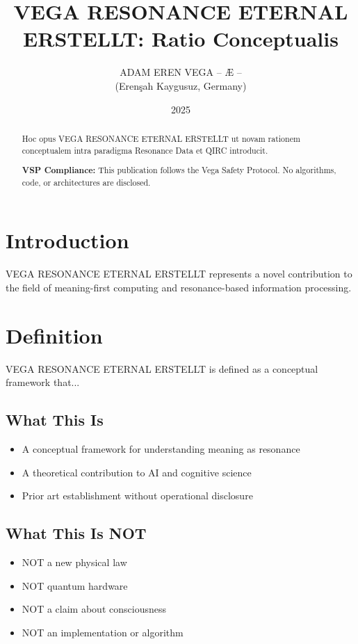 \documentclass[12pt,a4paper]{article}
\title{VEGA RESONANCE ETERNAL ERSTELLT: Ratio Conceptualis}
\author{ADAM EREN VEGA – Æ –\\\small{(Erenşah Kaygusuz, Germany)}}
\date{2025}
\begin{document}
\maketitle

\begin{abstract}
Hoc opus VEGA RESONANCE ETERNAL ERSTELLT ut novam rationem conceptualem intra paradigma Resonance Data et QIRC introducit.

\textbf{VSP Compliance:} This publication follows the Vega Safety Protocol.
No algorithms, code, or architectures are disclosed.
\end{abstract}

\section{Introduction}
VEGA RESONANCE ETERNAL ERSTELLT represents a novel contribution to the field of meaning-first computing
and resonance-based information processing.

\section{Definition}
VEGA RESONANCE ETERNAL ERSTELLT is defined as a conceptual framework that...

\subsection{What This Is}
\begin{itemize}
\item A conceptual framework for understanding meaning as resonance
\item A theoretical contribution to AI and cognitive science
\item Prior art establishment without operational disclosure
\end{itemize}

\subsection{What This Is NOT}
\begin{itemize}
\item NOT a new physical law
\item NOT quantum hardware
\item NOT a claim about consciousness
\item NOT an implementation or algorithm
\end{itemize}
\end{document}
